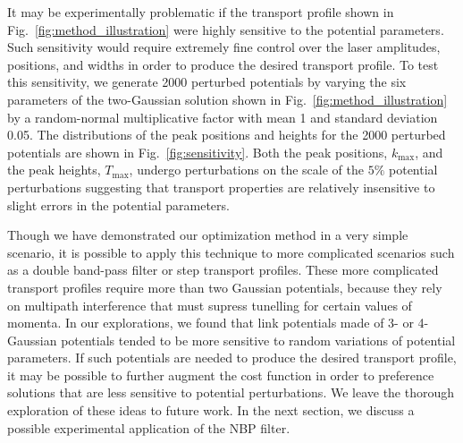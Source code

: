\documentclass[twocolumn,amsmath,amssymb,showpacs,pra,superscriptaddress,aps]{revtex4-1}
\begin{document}
It may be experimentally problematic if the transport profile shown in Fig.~\ref{fig:method_illustration} were highly sensitive to the potential parameters. Such sensitivity would require extremely fine control over the laser amplitudes, positions, and widths in order to produce the desired transport profile. To test this sensitivity, we generate 2000 perturbed potentials by varying the six parameters of the two-Gaussian solution shown in Fig.~\ref{fig:method_illustration} by a random-normal multiplicative factor with mean 1 and standard deviation 0.05. The distributions of the peak positions and heights for the 2000 perturbed potentials are shown in Fig.~\ref{fig:sensitivity}. Both the peak positions, $k_{\mathrm{max}}$, and the peak heights, $T_{\mathrm{max}}$, undergo perturbations on the scale of the $5\%$  potential perturbations suggesting that transport properties are relatively insensitive to slight errors in the potential parameters. 

Though we have demonstrated our optimization method in a very simple scenario, it is possible to apply this technique to more complicated scenarios such as a double band-pass filter or step transport profiles. These more complicated transport profiles require more than two Gaussian potentials,
because they rely on multipath interference that must supress tunelling for certain values of momenta. In our explorations, we found that link potentials made of 3- or 4-Gaussian potentials tended to be more sensitive to random variations of potential parameters. If such potentials are needed to produce the desired transport profile, it may be possible to further augment the cost function in order to preference solutions that are less sensitive to potential perturbations. We leave the thorough exploration of these ideas to future work. In the next section, we discuss a possible experimental application of the NBP filter.
\end{document}
